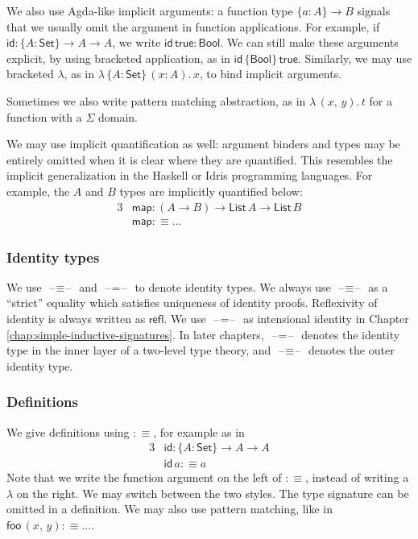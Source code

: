 \documentclass[12pt,a4paper,twoside,openany]{book}
\theoremstyle{remark}
\theoremstyle{definition}
\theoremstyle{theorem}
\newcommand{\ms}[1]{\mathsf{#1}}
\newcommand{\refl}{\mathsf{refl}}
\newcommand{\id}{\mathsf{id}}
\newcommand{\blank}{\mathord{\hspace{1pt}\text{--}\hspace{1pt}}}
\newcommand{\Set}{\mathsf{Set}}
\newcommand{\Bool}{\ms{Bool}}
\newcommand{\true}{\ms{true}}
\newcommand{\defn}{:\equiv}
\begin{document}
We also use Agda-like implicit arguments: a function type $\{a : A\} \to B$
signals that we usually omit the argument in function applications. For example,
if $\id : \{A : \Set\} \to A \to A$, we write $\id\,\true : \Bool$.  We can
still make these arguments explicit, by using bracketed application, as in
$\id\,\{\Bool\}\,\true$. Similarly, we may use bracketed $\lambda$, as in
$\lambda\,\{A : \Set\}\,(x : A).\,x$, to bind implicit arguments.

Sometimes we also write pattern matching abstraction, as in $\lambda\,(x,\,y).\,t$
for a function with a $\Sigma$ domain.

We may use implicit quantification as well: argument binders and types may be
entirely omitted when it is clear where they are quantified. This resembles the
implicit generalization in the Haskell or Idris programming languages. For example,
the $A$ and $B$ types are implicitly quantified below:
\begin{alignat*}{3}
  &\ms{map} : (A \to B) \to \ms{List}\,A \to \ms{List}\,B\\
  &\ms{map} \defn ...
\end{alignat*}

\subsubsection{Identity types}

We use $\blank\!\equiv\!\blank$ and $\blank\!=\!\blank$ to denote identity
types. We always use $\blank\!\equiv\!\blank$ as a ``strict'' equality which
satisfies uniqueness of identity proofs. Reflexivity of identity is always
written as $\refl$. We use $\blank\!=\!\blank$ as intensional identity in
Chapter \ref{chap:simple-inductive-signatures}.  In later chapters,
$\blank\!=\!\blank$ denotes the identity type in the inner layer of a two-level
type theory, and $\blank\!\equiv\!\blank$ denotes the outer identity type.

\subsubsection{Definitions}

We give definitions using $\defn$, for example as in
\begin{alignat*}{3}
  &\ms{id} : \{A : \Set\} \to A \to A\\
  &\ms{id}\,a \defn a
\end{alignat*}
Note that we write the function argument on the left of $\defn$, instead of
writing a $\lambda$ on the right. We may switch between the two styles. The
type signature can be omitted in a definition. We may also use pattern matching,
like in $\ms{foo}\,(x,\,y) \defn ...$.
\end{document}
